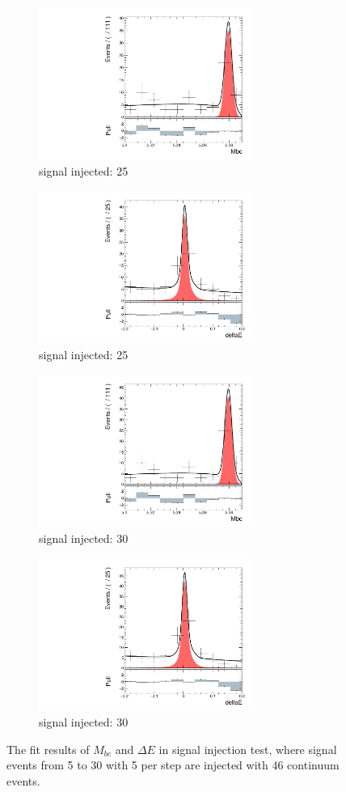 \begin{figure}[htpb]
	\begin{subfigure}{0.5\linewidth}
		\includegraphics[page=1,height=5cm]{figures/injection_sig_25/ds_gen_Mbc_2D.pdf}
		\caption{signal injected: 25}
	\end{subfigure}
	\begin{subfigure}{0.5\linewidth}
		\includegraphics[page=1,height=5cm]{figures/injection_sig_25/ds_gen_deltaE_2D.pdf}
		\caption{signal injected: 25}
	\end{subfigure}
	\begin{subfigure}{0.5\linewidth}
		\includegraphics[page=1,height=5cm]{figures/injection_sig_30/ds_gen_Mbc_2D.pdf}
		\caption{signal injected: 30}
	\end{subfigure}
	\begin{subfigure}{0.5\linewidth}
		\includegraphics[page=1,height=5cm]{figures/injection_sig_30/ds_gen_deltaE_2D.pdf}
		\caption{signal injected: 30}
	\end{subfigure}
\caption{The fit results of $M_{bc}$ and $\Delta E$ in signal injection test, where signal events from 5 to 30 with 5 per step are injected with 46 continuum events.}
\label{fig:2Dinject}
\end{figure}


